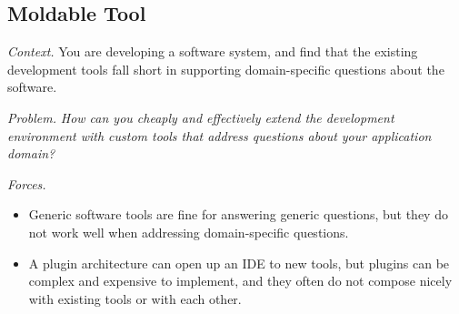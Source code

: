 \documentclass[sigconf,screen]{acmart}
\newcommand\tk[1]{\nbc{Timo}{#1}{cyan}}
\newcommand\kh[1]{\nbc{Konrad}{#1}{violet}}
\newcommand\cp[1]{\nbe{Cesare}{#1}{olive}} %
\newcommand\dd[1]{\nbe{Daniel}{#1}{magenta}} %
\newcommand{\pattern}[2]{\needlines{10}
\subsection*{#1}\label{pat:#2}}
\newcommand{\patsec}[1]{\noindent\textit{#1.}\xspace}
\begin{document}
\pattern{Moldable Tool}{MoldableTool}


\patsec{Context}
You are developing a software system, and find that the existing development tools fall short in supporting
domain-specific questions about the software.

\patsec{Problem}
\emph{How can you cheaply and effectively extend the development environment with custom tools that address questions about your application domain?}

\patsec{Forces}
\begin{itemize}[---]
\item Generic software tools are fine for answering generic questions, but they do not work well when addressing domain-specific questions.
\item A plugin architecture can open up an IDE to new tools, but plugins can be complex and expensive to implement, 
and they often do not compose nicely with existing tools or with each other.
\end{itemize}

\end{document}
